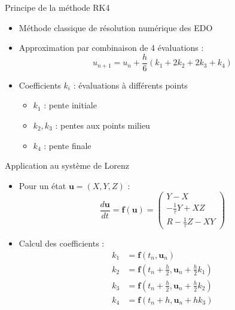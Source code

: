 
\begin{frame}{Principe de la méthode RK4}
    \begin{itemize}
        \item Méthode classique de résolution numérique des EDO
        \item Approximation par combinaison de 4 évaluations :
        \begin{equation}
            u_{n+1} = u_n + \frac{h}{6}(k_1 + 2k_2 + 2k_3 + k_4)
        \end{equation}
        \item Coefficients $k_i$ : évaluations à différents points
        \begin{itemize}
            \item $k_1$ : pente initiale
            \item $k_2, k_3$ : pentes aux points milieu
            \item $k_4$ : pente finale
        \end{itemize}
    \end{itemize}
\end{frame}

\begin{frame}{Application au système de Lorenz}
    \begin{itemize}
        \item Pour un état $\mathbf{u} = (X, Y, Z)$ :
        \begin{equation*}
            \frac{d\mathbf{u}}{dt} = \mathbf{f}(\mathbf{u}) = \begin{pmatrix}
                Y - X \\
                -\frac{1}{\tau}Y + XZ \\
                R - \frac{1}{\tau}Z - XY
            \end{pmatrix}
        \end{equation*}
        \item Calcul des coefficients :
        \begin{align*}
            k_1 &= \mathbf{f}(t_n, \mathbf{u}_n) \\
            k_2 &= \mathbf{f}(t_n + \frac{h}{2}, \mathbf{u}_n + \frac{h}{2}k_1) \\
            k_3 &= \mathbf{f}(t_n + \frac{h}{2}, \mathbf{u}_n + \frac{h}{2}k_2) \\
            k_4 &= \mathbf{f}(t_n + h, \mathbf{u}_n + hk_3)
        \end{align*}
    \end{itemize}
\end{frame}

